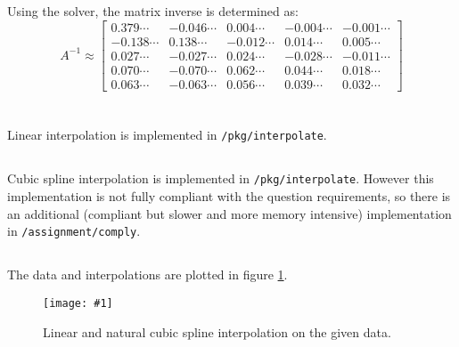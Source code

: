 \documentclass[10pt, a4paper]{article}
\newcommand{\plot}[3]{\begin{figure}[ht]\centering\texttt{[image: \#1]}\caption{#2}\label{#3}\end{figure}}
\begin{document}
  \subsection{}
  Using the solver, the matrix inverse is determined as:
  \begin{equation}
    A^{-1} \approx \begin{bmatrix}0.379\cdots & -0.046\cdots & 0.004\cdots & -0.004\cdots & -0.001\cdots \\ -0.138\cdots & 0.138\cdots & -0.012\cdots & 0.014\cdots & 0.005\cdots \\ 0.027\cdots & -0.027\cdots & 0.024\cdots & -0.028\cdots & -0.011\cdots \\ 0.070\cdots & -0.070\cdots & 0.062\cdots & 0.044\cdots & 0.018\cdots \\ 0.063\cdots & -0.063\cdots & 0.056\cdots & 0.039\cdots & 0.032\cdots\end{bmatrix}
  \end{equation}

\section{}
  \subsection{}
  Linear interpolation is implemented in \texttt{/pkg/interpolate}.

  \subsection{}
  Cubic spline interpolation is implemented in \texttt{/pkg/interpolate}. However this implementation is
  not fully compliant with the question requirements, so there is an additional (compliant but slower and
  more memory intensive) implementation in \texttt{/assignment/comply}.

  \subsection{}
  The data and interpolations are plotted in figure \ref{fig:interpolate}.

  \plot{assignment-q-3}{
    Linear and natural cubic spline interpolation on the given data.
  }{fig:interpolate}

\section{}
\end{document}
